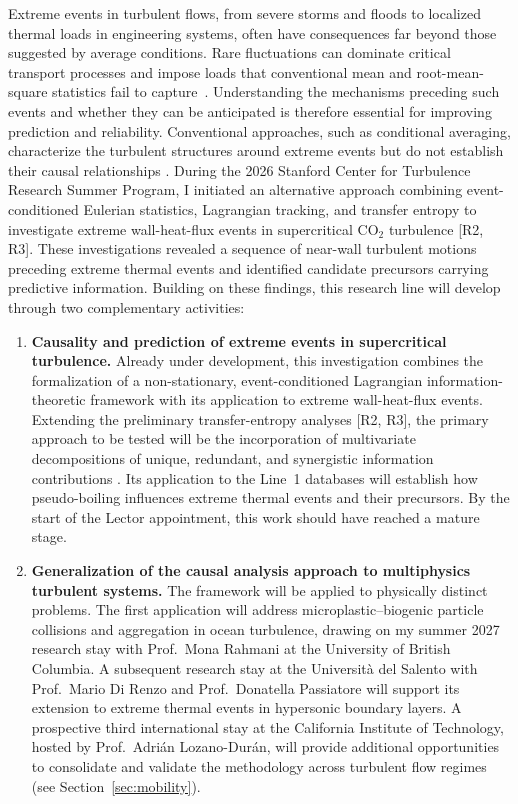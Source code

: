 \documentclass[11pt]{article}
\begin{document}
Extreme events in turbulent flows, from severe storms and floods to localized thermal loads in engineering systems, often have consequences far beyond those suggested by average conditions.
Rare fluctuations can dominate critical transport processes and impose loads that conventional mean and root-mean-square statistics fail to capture~\cite{Guerrero2020}.
Understanding the mechanisms preceding such events and whether they can be anticipated is therefore essential for improving prediction and reliability.
Conventional approaches, such as conditional averaging, characterize the turbulent structures around extreme events but do not establish their causal relationships \cite{Hack2021,Zhang2023}.
During the 2026 Stanford Center for Turbulence Research Summer Program, I initiated an alternative approach combining event-conditioned Eulerian statistics, Lagrangian tracking, and transfer entropy to investigate extreme wall-heat-flux events in supercritical CO$_2$ turbulence [R2, R3].
These investigations revealed a sequence of near-wall turbulent motions preceding extreme thermal events and identified candidate precursors carrying predictive information.
Building on these findings, this research line will develop through two complementary activities:
\begin{enumerate}
	\item \textbf{Causality and prediction of extreme events in supercritical turbulence.}
	Already under development, this investigation combines the formalization of a non-stationary, event-conditioned Lagrangian information-theoretic framework with its application to extreme wall-heat-flux events.
	Extending the preliminary transfer-entropy analyses [R2, R3], the primary approach to be tested will be the incorporation of multivariate decompositions of unique, redundant, and synergistic information contributions \cite{MartinezSanchez2024}.
	Its application to the Line~1 databases will establish how pseudo-boiling influences extreme thermal events and their precursors.
	By the start of the Lector appointment, this work should have reached a mature stage.
	
	\item \textbf{Generalization of the causal analysis approach to multiphysics turbulent systems.}
	The framework will be applied to physically distinct problems.
	The first application will address microplastic--biogenic particle collisions and aggregation in ocean turbulence, drawing on my summer 2027 research stay with Prof.~Mona Rahmani at the University of British Columbia.
	A subsequent research stay at the Universit\`a del Salento with Prof.~Mario Di Renzo and Prof.~Donatella Passiatore will support its extension to extreme thermal events in hypersonic boundary layers.
	A prospective third international stay at the California Institute of Technology, hosted by Prof.~Adrián Lozano-Durán, will provide additional opportunities to consolidate and validate the methodology across turbulent flow regimes (see Section~\ref{sec:mobility}).
\end{enumerate}
\end{document}
